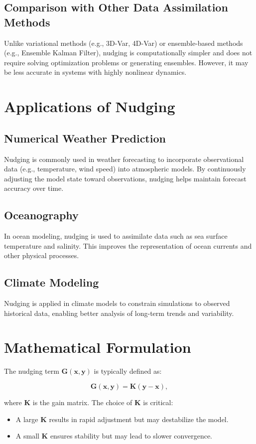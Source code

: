 \documentclass[12pt,oneside]{article}
\theoremstyle{plain}
\begin{document}
\subsection{Comparison with Other Data Assimilation Methods}
Unlike variational methods (e.g., 3D-Var, 4D-Var) or ensemble-based methods (e.g., Ensemble Kalman Filter), nudging is computationally simpler and does not require solving optimization problems or generating ensembles. However, it may be less accurate in systems with highly nonlinear dynamics.

\section{Applications of Nudging}
\subsection{Numerical Weather Prediction}
Nudging is commonly used in weather forecasting to incorporate observational data (e.g., temperature, wind speed) into atmospheric models. By continuously adjusting the model state toward observations, nudging helps maintain forecast accuracy over time.

\subsection{Oceanography}
In ocean modeling, nudging is used to assimilate data such as sea surface temperature and salinity. This improves the representation of ocean currents and other physical processes.

\subsection{Climate Modeling}
Nudging is applied in climate models to constrain simulations to observed historical data, enabling better analysis of long-term trends and variability.

\section{Mathematical Formulation}
The nudging term \( \mathbf{G}(\mathbf{x}, \mathbf{y}) \) is typically defined as:


\[
\mathbf{G}(\mathbf{x}, \mathbf{y}) = \mathbf{K} (\mathbf{y} - \mathbf{x}),
\]


where \( \mathbf{K} \) is the gain matrix. The choice of \( \mathbf{K} \) is critical:
\begin{itemize}
    \item A large \( \mathbf{K} \) results in rapid adjustment but may destabilize the model.
    \item A small \( \mathbf{K} \) ensures stability but may lead to slower convergence.
\end{itemize}
\end{document}
